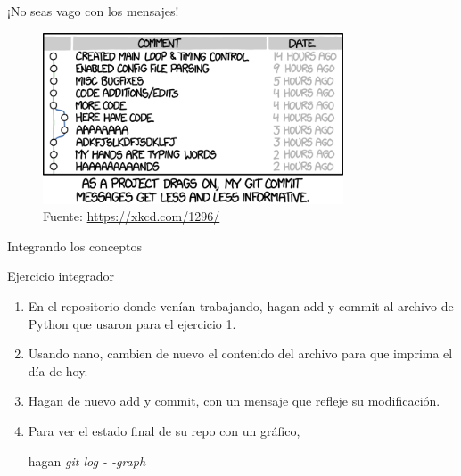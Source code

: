 \begin{frame}[t]{¡No seas vago con los mensajes!}

    \begin{figure}[ht]
        \begin{center}
            \includegraphics[height=2in]{images/xkcd-git-commit.png}
        \end{center}
        \caption{Fuente: \url{https://xkcd.com/1296/}}
    \end{figure}

\end{frame}

\begin{frame}{Integrando los conceptos}
\begin{ejercicio} {Ejercicio integrador}
    \begin{enumerate}
        \item En el repositorio donde venían trabajando, hagan add y commit al archivo de Python que usaron para el ejercicio 1.
        \pause
        \item Usando nano, cambien de nuevo el contenido del archivo para que imprima el día de hoy.
        \pause
        \item Hagan de nuevo add y commit, con un mensaje que refleje su modificación.
        \pause
        \item Para ver el estado final de su repo con un gráfico, 
        
        hagan \textit{git log - -graph}
    \end{enumerate}
\end{ejercicio}
    
\end{frame}


